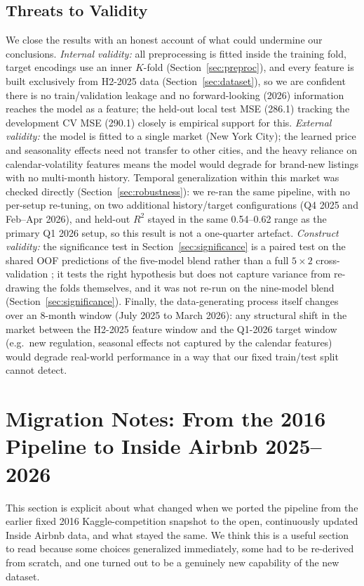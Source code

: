 \documentclass[journal]{IEEEtran}
\begin{document}
\subsection{Threats to Validity}
\label{sec:threats}
We close the results with an honest account of what could undermine our
conclusions. \emph{Internal validity:} all preprocessing is fitted inside the
training fold, target encodings use an inner $K$-fold
(Section~\ref{sec:preproc}), and every feature is built exclusively from H2-2025
data (Section~\ref{sec:dataset}), so we are confident there is no
train/validation leakage and no forward-looking (2026) information reaches the
model as a feature; the held-out local test MSE (286.1) tracking the
development CV MSE (290.1) closely is empirical support for this.
\emph{External validity:} the model is fitted to a single market (New York
City); the learned price and seasonality effects need not transfer to other
cities, and the heavy reliance on calendar-volatility features means the
model would degrade for brand-new listings with no multi-month history.
Temporal generalization within this market was checked directly
(Section~\ref{sec:robustness}): we re-ran the same pipeline, with no
per-setup re-tuning, on two additional history/target configurations (Q4
2025 and Feb--Apr 2026), and held-out $R^2$ stayed in the same 0.54--0.62
range as the primary Q1 2026 setup, so this result is not a one-quarter
artefact. \emph{Construct validity:} the
significance test in Section~\ref{sec:significance} is a paired test on the
shared OOF predictions of the five-model blend rather than a full $5\times2$
cross-validation \cite{dietterich1998}; it tests the right hypothesis but does
not capture variance from re-drawing the folds themselves, and it was not
re-run on the nine-model blend (Section~\ref{sec:significance}). Finally, the
data-generating process itself changes over an 8-month window (July 2025 to
March 2026): any structural shift in the market between the H2-2025 feature
window and the Q1-2026 target window (e.g.\ new regulation, seasonal effects
not captured by the calendar features) would degrade real-world performance in
a way that our fixed train/test split cannot detect.

\section{Migration Notes: From the 2016 Pipeline to Inside Airbnb 2025--2026}
\label{sec:changes}
This section is explicit about what changed when we ported the pipeline from
the earlier fixed 2016 Kaggle-competition snapshot to the open, continuously
updated Inside Airbnb data, and what stayed the same. We think this is a
useful section to read because some choices generalized immediately, some had
to be re-derived from scratch, and one turned out to be a genuinely new
capability of the new dataset.
\end{document}
